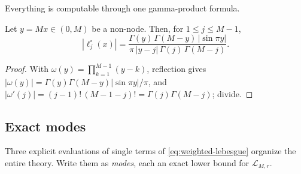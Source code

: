 \documentclass[11pt,oneside]{article}
\numberwithin{equation}{section}
\theoremstyle{definition}
\theoremstyle{remark}
\newcommand{\abs}[1]{\left\lvert #1\right\rvert}
\newcommand{\Leb}{\mathscr L}
\begin{document}
Everything is computable through one gamma-product formula.

\begin{lemma}
\label{lem:gamma-cardinal}
Let $y=Mx\in(0,M)$ be a non-node.  Then, for $1\le j\le M-1$,
\begin{equation}
 \abs{\ell^{\circ}_j(x)}
 =\frac{\Gamma(y)\,\Gamma(M-y)\,\abs{\sin\pi y}}
 {\pi\,\abs{y-j}\,\Gamma(j)\,\Gamma(M-j)}.
 \label{eq:gamma-cardinal}
\end{equation}
\end{lemma}

\begin{proof}
With $\omega(y)=\prod_{k=1}^{M-1}(y-k)$, reflection gives
$\abs{\omega(y)}=\Gamma(y)\Gamma(M-y)\abs{\sin\pi y}/\pi$, and
$\abs{\omega'(j)}=(j-1)!\,(M-1-j)!=\Gamma(j)\Gamma(M-j)$; divide.
\end{proof}

\subsection{Exact modes}

Three explicit evaluations of single terms of
\eqref{eq:weighted-lebesgue} organize the entire theory.  Write them
as \emph{modes}, each an exact lower bound for $\Leb_{M,r}$.
\end{document}
